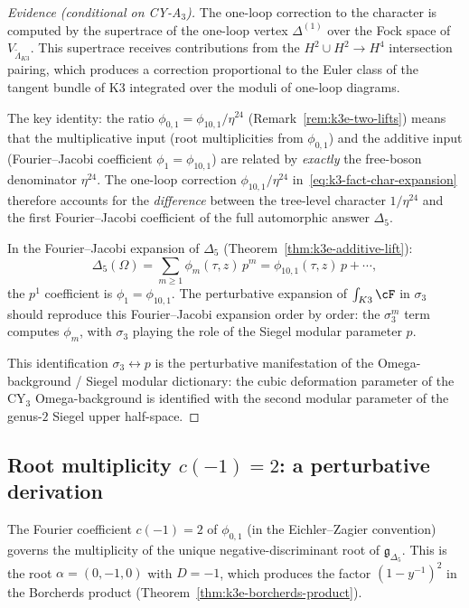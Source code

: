 \begin{proof}[Evidence (conditional on CY-A$_3$)]
The one-loop correction to the character is computed by the
supertrace of the one-loop vertex $\Delta^{(1)}$ over the Fock
space of $V_{\widetilde{\Lambda}_{K3}}$. This supertrace receives
contributions from the $H^2 \cup H^2 \to H^4$ intersection
pairing, which produces a correction proportional to the
Euler class of the tangent bundle of K3 integrated over the
moduli of one-loop diagrams.

The key identity: the ratio $\phi_{0,1} = \phi_{10,1}/\eta^{24}$
(Remark~\ref{rem:k3e-two-lifts}) means that the multiplicative
input (root multiplicities from $\phi_{0,1}$) and the additive
input (Fourier--Jacobi coefficient $\phi_1 = \phi_{10,1}$) are
related by \emph{exactly} the free-boson denominator
$\eta^{24}$. The one-loop correction $\phi_{10,1}/\eta^{24}$
in~\eqref{eq:k3-fact-char-expansion} therefore accounts for the
\emph{difference} between the tree-level character
$1/\eta^{24}$ and the first Fourier--Jacobi coefficient of the
full automorphic answer $\Delta_5$.

In the Fourier--Jacobi expansion of $\Delta_5$
(Theorem~\ref{thm:k3e-additive-lift}):
\[
  \Delta_5(\Omega)
  = \sum_{m \geq 1} \phi_m(\tau, z)\, p^m
  = \phi_{10,1}(\tau, z)\, p + \cdots,
\]
the $p^1$ coefficient is $\phi_1 = \phi_{10,1}$. The
perturbative expansion of $\int_{K3} \cF$ in $\sigma_3$ should
reproduce this Fourier--Jacobi expansion order by order:
the $\sigma_3^m$ term computes $\phi_m$, with $\sigma_3$
playing the role of the Siegel modular parameter $p$.

This identification $\sigma_3 \leftrightarrow p$ is the
perturbative manifestation of the Omega-background / Siegel
modular dictionary: the cubic deformation parameter of the
CY$_3$ Omega-background is identified with the second modular
parameter of the genus-$2$ Siegel upper half-space.
\end{proof}

\subsection{Root multiplicity $c(-1) = 2$: a perturbative derivation}
\label{subsec:k3-fact-c-minus-1}

The Fourier coefficient $c(-1) = 2$ of $\phi_{0,1}$ (in the
Eichler--Zagier convention) governs the multiplicity of the unique
negative-discriminant root of $\mathfrak{g}_{\Delta_5}$. This is
the root $\alpha = (0, -1, 0)$ with $D = -1$, which produces the
factor $(1 - y^{-1})^2$ in the Borcherds product
(Theorem~\ref{thm:k3e-borcherds-product}).

